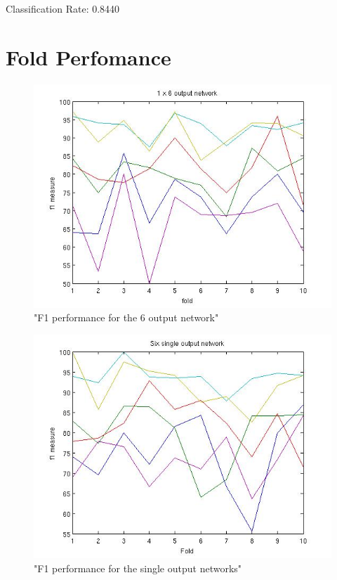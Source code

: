 \documentclass[11pt]{article}
\begin{document}
Classification Rate: 0.8440

\section{Fold Perfomance}
\begin{figure} [H]
\includegraphics[width=\linewidth]{1by6plot.jpg}
\caption{"F1 performance for the 6 output network"}
\end{figure}
\begin{figure} [H]
\includegraphics[width=\linewidth]{6by1plot.jpg}
\caption{"F1 performance for the single output networks"}
\end{figure}
\end{document}
